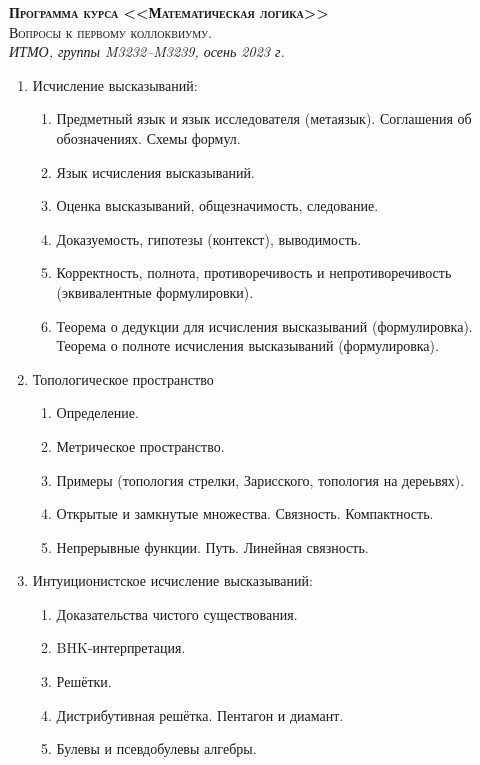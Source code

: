 \documentclass[11pt,a4paper,oneside]{scrartcl}
\begin{document}
\pagestyle{empty}

\begin{center}
{\large\scshape\bfseries Программа курса <<Математическая логика>>}\\
{\large\scshape Вопросы к первому коллоквиуму.}\\
\itshape ИТМО, группы M3232--M3239, осень 2023 г.
\end{center}


\begin{enumerate}
\item Исчисление высказываний:
\begin{enumerate}
\item Предметный язык и язык исследователя (метаязык). Соглашения об обозначениях. Схемы формул.
\item Язык исчисления высказываний.
\item Оценка высказываний, общезначимость, следование.
\item Доказуемость, гипотезы (контекст), выводимость.
\item Корректность, полнота, противоречивость и непротиворечивость (эквивалентные формулировки).
\item Теорема о дедукции для исчисления высказываний (формулировка). Теорема о полноте исчисления высказываний (формулировка).
\end{enumerate}
\item Топологическое пространство
\begin{enumerate}
\item Определение.
\item Метрическое пространство.
\item Примеры (топология стрелки, Зарисского, топология на дереьвях). 
\item Открытые и замкнутые множества. Связность. Компактность. 
\item Непрерывные функции. Путь. Линейная связность. 
\end{enumerate}
\item Интуиционистское исчисление высказываний:
\begin{enumerate}
\item Доказательства чистого существования.
\item BHK-интерпретация. 
\item Решётки. 
\item Дистрибутивная решётка. Пентагон и диамант.
\item Булевы и псевдобулевы алгебры.

\end{enumerate}
\end{enumerate}
\end{document}
